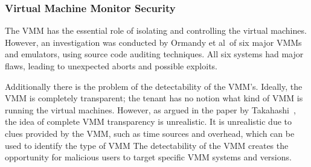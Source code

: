 \subsubsection{Virtual Machine Monitor Security}
The \acl{VMM} has the essential role of isolating and controlling the virtual machines. 
However, an investigation was conducted by Ormandy et al~\cite{Ormandy2007Security}of six major \acp{VMM} and emulators, using source code auditing techniques. All six systems had major flaws, leading to unexpected aborts and possible exploits.

Additionally there is the problem of the detectability of the \ac{VMM}’s. Ideally, the \ac{VMM} is completely transparent; the tenant has no notion what kind of \ac{VMM} is running the virtual machines. 
However, as argued in the paper by Takahashi~\cite{Takahashi2012Security}, the idea of complete \ac{VMM} transparency is unrealistic. 
It is unrealistic due to clues provided by the \ac{VMM}, such as time sources and overhead, which can be used to identify the type of \ac{VMM}
The detectability of the \ac{VMM} creates the opportunity for malicious users to target specific \ac{VMM} systems and versions.

